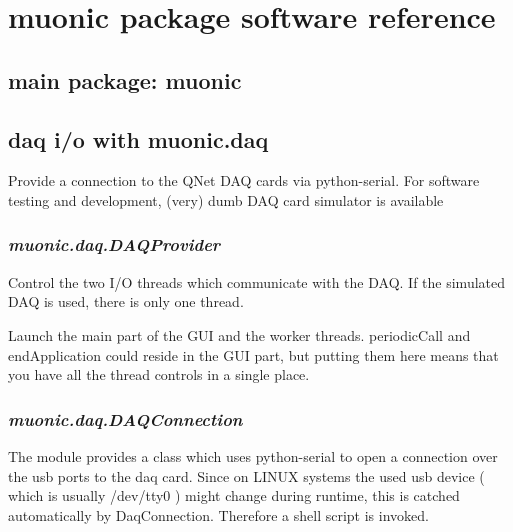 \documentclass[letterpaper,10pt,english]{sphinxmanual}
\begin{document}
\section{muonic package software reference}
\label{muonic::doc}\label{muonic:muonic-package-software-reference}

\subsection{main package: muonic}
\label{muonic:module-muonic}\label{muonic:main-package-muonic}
{\hyperref[muonic:module-muonic.daq]{}}
{\hyperref[muonic:module-muonic.gui]{}}
{\hyperref[muonic:module-muonic.analysis]{}}


\subsection{daq i/o with muonic.daq}
\label{muonic:module-muonic.daq}\label{muonic:daq-i-o-with-muonic-daq}
Provide a connection to the QNet DAQ cards via python-serial. For software testing and development, (very) dumb DAQ card simulator is available


\subsubsection{\emph{muonic.daq.DAQProvider}}
\label{muonic:muonic-daq-daqprovider}
Control the two I/O threads which communicate with the DAQ. If the simulated DAQ is used, there is only one thread.
\label{muonic:module-muonic.daq.DAQProvider}

\begin{fulllineitems}
\label{muonic:muonic.daq.DAQProvider.DAQProvider}
Launch the main part of the GUI and the worker threads. periodicCall and
endApplication could reside in the GUI part, but putting them here
means that you have all the thread controls in a single place.

\end{fulllineitems}



\subsubsection{\emph{muonic.daq.DAQConnection}}
\label{muonic:muonic-daq-daqconnection}
The module provides a class which uses python-serial to open a connection over the usb ports to the daq card. Since on LINUX systems the used usb device ( which is usually /dev/tty0 ) might change during runtime, this is catched automatically by DaqConnection. Therefore a shell script is invoked.
\label{muonic:module-muonic.daq.DaqConnection}
\end{document}
